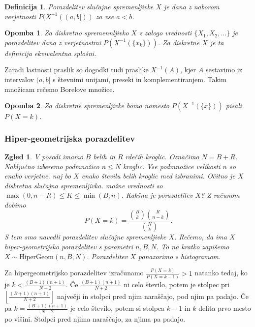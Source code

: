 \documentclass[10pt, a4paper]{article}
\newtheorem{defi}[izr]{Definicija}
\newenvironment{noticeB}{%
  \tcolorbox[%
  notitle,
  empty,
  enhanced,  %
  breakable,
  coltext=black,
  colback=white, 
  fontupper=\rmfamily,
  noparskip,
  sharp corners,
  boxrule=-1pt,  %
  frame hidden,
  left=7pt,  %
  right=7pt,
  top=5pt,
  bottom=5pt,
  before skip=2.5ex plus 2pt,
  after skip=2.5ex plus 2pt,
  borderline west = {1.5pt}{-0.1pt}{blue!30!black}, %
  overlay unbroken and last={%
    \draw[color=black, line width=1.25pt]
    ($(frame.south west)+(1.pt, -0.1pt)$) -- ++(2em, 0);
  }
  ]}
{\endtcolorbox}
\newenvironment{definicija}{\begin{noticeB}\begin{defi}}{%
    \end{defi}\end{noticeB}}
\newtheorem*{opomba}{Opomba}
\newtheorem{zgled}[izr]{Zgled}
\begin{document}
\begin{definicija}
  Porazdelitev slučajne spremenljivke $X$ je dana z naborom 
  verjetnosti $P(X^{-1} ((a, b]))$ za vse $a < b$.
\end{definicija}

\begin{opomba}
  Za diskretno spremennljivko $X$ z zalogo vrednosti $\{X_1, X_2, \dots\}$ je porazdelitev dana 
  z verjetnostmi $P(X^{-1} (\{x_k\}))$.
  Za diskretne $X$ je ta definicija ekvivalentna splošni.
\end{opomba}

Zaradi lastnosti praslik so dogodki tudi praslike $X^{-1} (A)$, kjer $A$ 
sestavimo iz intervalov $(a, b]$ s števnimi unijami, preseki in komplementiranjem.
Takim množicam rečemo Borelove množice.

\begin{opomba}
  Za diskretne spremenljivke bomo namesto $P(X^{-1} (\{x\}))$ pisali $P(X = k)$.
\end{opomba}

\subsubsection*{Hiper-geometrijska porazdelitev}

\begin{zgled}
  V posodi imamo $B$ belih in $R$ rdečih kroglic.
  Označimo $N = B + R$. Naključno izberemo podmnožico $n \leq N$
  kroglic. Vse podmnožice velikosti $n$ so enako verjetne.
  naj bo $X$ enako številu belih kroglic med izbranimi.
  Očitno je $X$ diskretna slučajna spremenljivka.
  možne vrednosti so 
  $\max(0, n - R) \leq K \leq \min(B, n).$
  Kakšna je porazdelitev $X$? Z računom dobimo 
  $$P(X = k) = \frac{\binom{B}{k} \binom{R}{n - k}}{\binom{N}{k}}.$$
  S tem smo navedli porazdelitev slučajne spremenljivke $X$.
  Rečemo, da ima $X$ hiper-geometrijsko porazdelitev s parametri $n, B, N$.
  To na kratko zapišemo $X \sim \mathrm{HiperGeom} (n, B, N)$.
  Porazdelitev $X$ ponazorimo s histogramom.
\end{zgled}

Za hipergeometrijsko porazdelitev izračunamo $\frac{P(X = k)}{P(X = k - 1)} > 1$
natanko tedaj, ko je $k < \frac{(B + 1)(n + 1)}{N + 2}$.
Če $\frac{(B + 1)(n + 1)}{N + 2}$ ni celo število, potem je stolpec pri 
$\left\lfloor \frac{(B + 1)(n + 1)}{N + 2} \right\rfloor$ največji in stolpci pred njim naraščajo, pod njim pa padajo.
Če pa $k = \frac{(B + 1)(n + 1)}{N + 2}$ je celo število, potem si stolpca $k - 1$ in $k$
delita prvo mesto po višini. Stolpci pred njima naraščajo, za njima pa padajo.
\end{document}
